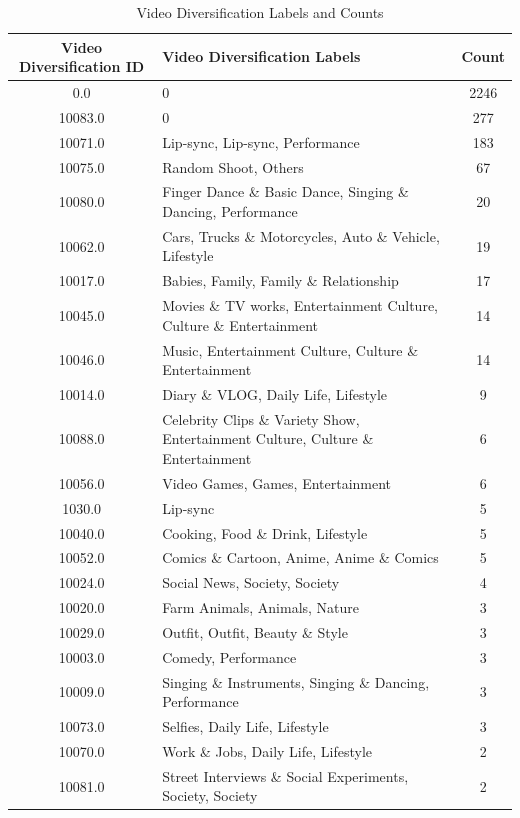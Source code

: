 \documentclass[12pt,a4paper]{report}
\begin{document}
\clearpage %
\begin{table}[h]
\centering
\caption{Video Diversification Labels and Counts}
\label{tab:diversification_label}
\begin{tabular}{|c|p{8cm}|c|}
\hline
\textbf{Video Diversification ID} & \textbf{Video Diversification Labels} & \textbf{Count} \\
\hline
0.0 & 0 & 2246 \\
10083.0 & 0 & 277 \\
10071.0 & Lip-sync, Lip-sync, Performance & 183 \\
10075.0 & Random Shoot, Others & 67 \\
10080.0 & Finger Dance \& Basic Dance, Singing \& Dancing, Performance & 20 \\
10062.0 & Cars, Trucks \& Motorcycles, Auto \& Vehicle, Lifestyle & 19 \\
10017.0 & Babies, Family, Family \& Relationship & 17 \\
10045.0 & Movies \& TV works, Entertainment Culture, Culture \& Entertainment & 14 \\
10046.0 & Music, Entertainment Culture, Culture \& Entertainment & 14 \\
10014.0 & Diary \& VLOG, Daily Life, Lifestyle & 9 \\
10088.0 & Celebrity Clips \& Variety Show, Entertainment Culture, Culture \& Entertainment & 6 \\
10056.0 & Video Games, Games, Entertainment & 6 \\
1030.0 & Lip-sync & 5 \\
10040.0 & Cooking, Food \& Drink, Lifestyle & 5 \\
10052.0 & Comics \& Cartoon, Anime, Anime \& Comics & 5 \\
10024.0 & Social News, Society, Society & 4 \\
10020.0 & Farm Animals, Animals, Nature & 3 \\
10029.0 & Outfit, Outfit, Beauty \& Style & 3 \\
10003.0 & Comedy, Performance & 3 \\
10009.0 & Singing \& Instruments, Singing \& Dancing, Performance & 3 \\
10073.0 & Selfies, Daily Life, Lifestyle & 3 \\
10070.0 & Work \& Jobs, Daily Life, Lifestyle & 2 \\
10081.0 & Street Interviews \& Social Experiments, Society, Society & 2 \\

\end{tabular}
\end{table}
\end{document}

